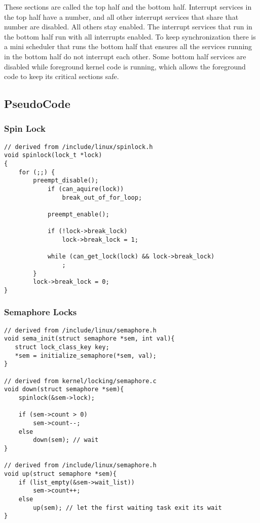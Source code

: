 \documentclass[12pt]{article}
\begin{document}
These sections are called the top half and the bottom half. Interrupt services in the top half have a number, and all other interrupt services that share that number are disabled. All others stay enabled. The interrupt services that run in the bottom half run with all interrupts enabled. To keep synchronization there is a mini scheduler that runs the bottom half that ensures all the services running in the bottom half do not interrupt each other. Some bottom half services are disabled while foreground kernel code is running, which allows the foreground code to keep its critical sections safe.

\pagebreak
\subsection{PseudoCode}
\subsubsection{Spin Lock}
\singlespacing
\begin{lstlisting}
// derived from /include/linux/spinlock.h
void spinlock(lock_t *lock)                   
{                                                                       
	for (;;) {                                                      
		preempt_disable();			
	        if (can_aquire(lock))                
	            break_out_of_for_loop;
				
	        preempt_enable();                                       
	        
	        if (!lock->break_lock)                                
	            lock->break_lock = 1;      
					
	        while (can_get_lock(lock) && lock->break_lock)
	            ;             
        }                                                               
        lock->break_lock = 0;                                         
} 
\end{lstlisting}
\doublespacing
\subsubsection{Semaphore Locks}
\singlespacing
\begin{lstlisting}
// derived from /include/linux/semaphore.h
void sema_init(struct semaphore *sem, int val){
   struct lock_class_key key;
   *sem = initialize_semaphore(*sem, val);
}

// derived from kernel/locking/semaphore.c
void down(struct semaphore *sem){
	spinlock(&sem->lock);
	
	if (sem->count > 0)
	    sem->count--;
	else
	    down(sem); // wait
}

// derived from /include/linux/semaphore.h
void up(struct semaphore *sem){
    if (list_empty(&sem->wait_list))
        sem->count++;
    else
        up(sem); // let the first waiting task exit its wait
}

\end{lstlisting}
\doublespacing
\end{document}
